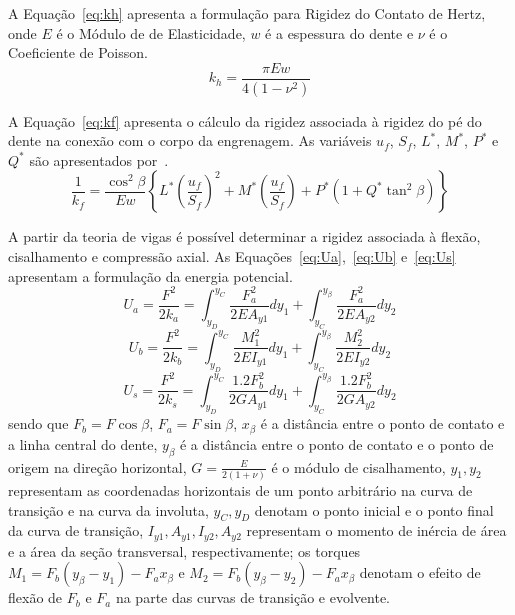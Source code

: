 \newpage
A Equação~\ref{eq:kh} apresenta a formulação para Rigidez do Contato de Hertz, onde $E$ é o Módulo de de Elasticidade, $w$ é a espessura do dente e $\nu$ é o Coeficiente de Poisson.
\begin{equation} \label{eq:kh}
	k_h = \frac{\pi E w}{4(1 - \nu^2)}
\end{equation}

A Equação~\ref{eq:kf} apresenta o cálculo da rigidez associada à rigidez do pé do dente na conexão com o corpo da engrenagem. As variáveis $u_f$, $S_f$, $L^*$, $M^*$, $P^*$ e $Q^*$ são apresentados por~.
\begin{equation} \label{eq:kf}
	\frac{1}{k_f} = \frac{\cos^2 \beta}{Ew} \left\{ L^* \left(\frac{u_f}{S_f}\right)^2 + M^* \left(\frac{u_f}{S_f}\right) + P^*(1 + Q^* \tan^2 \beta) \right\}
\end{equation}

A partir da teoria de vigas é possível determinar a rigidez associada à flexão, cisalhamento e compressão axial. As Equações~\ref{eq:Ua},~\ref{eq:Ub} e~\ref{eq:Us} apresentam a formulação da energia potencial.
\begin{equation} \label{eq:Ua}
	U_a = \frac{F^2}{2k_a} = \int_{y_D}^{y_C} \frac{F_a^2}{2EA_{y1}} dy_1 + \int_{y_C}^{y_\beta} \frac{F_a^2}{2EA_{y2}} dy_2
\end{equation}
\begin{equation} \label{eq:Ub}
	U_b = \frac{F^2}{2k_b} = \int_{y_D}^{y_C} \frac{M_1^2}{2EI_{y1}} dy_1 + \int_{y_C}^{y_\beta} \frac{M_2^2}{2EI_{y2}} dy_2
\end{equation}
\begin{equation} \label{eq:Us}
	U_s = \frac{F^2}{2k_s} = \int_{y_D}^{y_C} \frac{1.2F_b^2}{2GA_{y1}} dy_1 + \int_{y_C}^{y_\beta} \frac{1.2F_b^2}{2GA_{y2}} dy_2
\end{equation}
sendo que $F_b = F \cos \beta$, $F_a = F \sin \beta$, $x_\beta$ é a distância entre o ponto de contato e a linha central do dente, $y_\beta$ é a distância entre o ponto de contato e o ponto de origem na direção horizontal, $G = \frac{E}{2(1+\nu)}$ é o módulo de cisalhamento, $y_1, y_2$ representam as coordenadas horizontais de um ponto arbitrário na curva de transição e na curva da involuta, $y_C, y_D$ denotam o ponto inicial e o ponto final da curva de transição, $I_{y1}, A_{y1}, I_{y2}, A_{y2}$ representam o momento de inércia de área e a área da seção transversal, respectivamente; os torques $M_1 = F_b(y_\beta - y_1) - F_a x_\beta$ e $M_2 = F_b(y_\beta - y_2) - F_a x_\beta$ denotam o efeito de flexão de $F_b$ e $F_a$ na parte das curvas de transição e evolvente.


